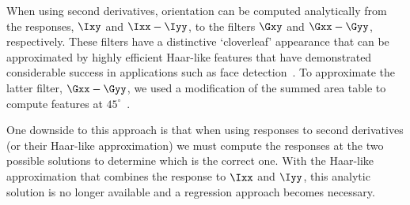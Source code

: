 \label{s:filtering_haar}
%

When using second derivatives, orientation can be computed analytically from the responses, $\Ixy$ and $\Ixx-\Iyy$, to the filters $\Gxy$ and $\Gxx-\Gyy$, respectively. These filters have a distinctive `cloverleaf' appearance that can be approximated by highly efficient Haar-like features that have demonstrated considerable success in applications such as face detection~\cite{Viola_Jones_IJCV04}. To approximate the latter filter, $\Gxx-\Gyy$, we used a modification of the summed area table to compute features at $45^\circ$~\cite{Lienhart_Maydt_ICIP02}.

One downside to this approach is that when using responses to second derivatives (or their Haar-like approximation) we must compute the responses at the two possible solutions to determine which is the correct one. With the Haar-like approximation that combines the response to $\Ixx$ and $\Iyy$, this analytic solution is no longer available and a regression approach becomes necessary.
